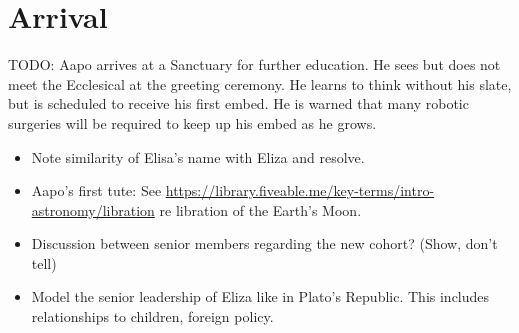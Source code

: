 %
%

\chapter{Arrival}

TODO: Aapo arrives at a Sanctuary for further education. He sees but does not meet the Ecclesical at the greeting ceremony. He learns to think without his slate, but is scheduled to receive his first embed. He is warned that many robotic surgeries will be required to keep up his embed as he grows.

\begin{itemize}
\item Note similarity of Elisa's name with Eliza and resolve.
\item Aapo's first tute: See \url{https://library.fiveable.me/key-terms/intro-astronomy/libration} re libration of the Earth's Moon.
\item Discussion between senior members regarding the new cohort? (Show, don't tell)
\item Model the senior leadership of Eliza like in Plato's Republic. This includes relationships to children, foreign policy.
\end{itemize}


\newpage
\thispagestyle{empty}

